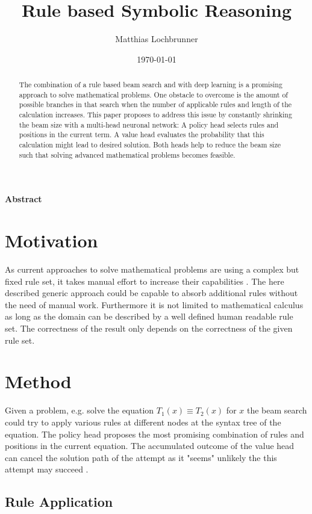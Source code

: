 \documentclass{scrartcl}
\title{Rule based Symbolic Reasoning}
\author{Matthias Lochbrunner}
\date{\today}
\theoremstyle{definition}
\begin{document}
\maketitle
\begin{center}
	\textbf{Abstract}
\end{center}
\begin{abstract}
	The combination of a rule based beam search and with deep learning is a promising approach to solve mathematical problems.
	One obstacle to overcome is the amount of possible branches in that search when the number of applicable rules and length of the calculation increases.
	This paper proposes to address this issue by constantly shrinking the beam size with a multi-head neuronal network:
	A policy head selects rules and positions in the current term. A value head evaluates the probability that this calculation might lead to desired solution.
	Both heads help to reduce the beam size such that solving advanced mathematical problems becomes feasible.
\end{abstract}

\section{Motivation}

As current approaches to solve mathematical problems are using a complex but fixed rule set, it takes manual effort to increase their capabilities \cite{wolfram}.
The here described generic approach could be capable to absorb additional rules without the need of manual work.
Furthermore it is not limited to mathematical calculus as long as the domain can be described by a well defined human readable rule set.
The correctness of the result only depends on the correctness of the given rule set.

\section{Method}

Given a problem, e.g. solve the equation $T_1\left(x\right)\equiv T_2\left(x\right)$ for $x$ the beam search could try to apply various rules at different nodes at the syntax tree of the equation.
The policy head proposes the most promising combination of rules and positions in the current equation.
The accumulated outcome of the value head can cancel the solution path of the attempt as it "seems" unlikely the this attempt may succeed \cite{44806}.

\subsection{Rule Application}
\end{document}
